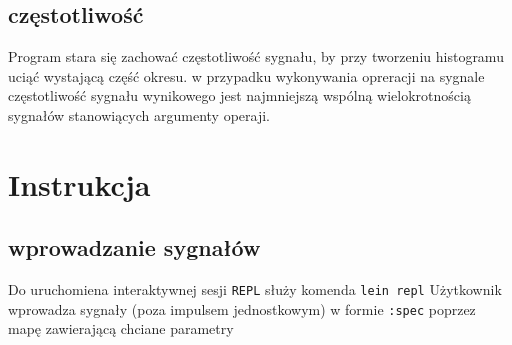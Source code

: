 \documentclass[12pt]{article}
\newcommand{\cljt}[1]{\texttt{#1}}
\begin{document}
\subsection{częstotliwość}
Program stara się zachować częstotliwość sygnału, by przy tworzeniu histogramu uciąć wystającą część okresu. w przypadku wykonywania opreracji na sygnale częstotliwość sygnału wynikowego jest najmniejszą wspólną wielokrotnością sygnałów stanowiących argumenty operaji.
\section{Instrukcja}
\subsection{wprowadzanie sygnałów}
Do uruchomiena interaktywnej sesji \texttt{REPL} służy komenda \texttt{lein repl}
Użytkownik wprowadza sygnały (poza impulsem jednostkowym) w formie \cljt{:spec} poprzez mapę zawierającą
chciane parametry
\end{document}
